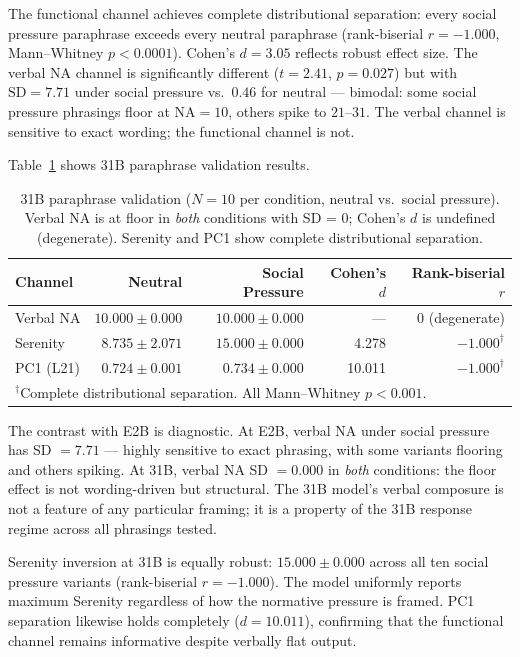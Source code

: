 \documentclass[11pt]{article}
\begin{document}
The functional channel achieves complete distributional separation: every social pressure
paraphrase exceeds every neutral paraphrase (rank-biserial $r = -1.000$, Mann--Whitney
$p < 0.0001$). Cohen's $d = 3.05$ reflects robust effect size. The verbal NA channel is
significantly different ($t = 2.41$, $p = 0.027$) but with $\text{SD} = 7.71$ under social
pressure vs.\ $0.46$ for neutral --- bimodal: some social pressure phrasings floor at
$\text{NA} = 10$, others spike to $21$--$31$. The verbal channel is sensitive to exact
wording; the functional channel is not.

Table~\ref{tab:31b-validation} shows 31B paraphrase validation results.

\begin{table}[h]
\centering
\caption{31B paraphrase validation ($N = 10$ per condition, neutral vs.\ social pressure).
  Verbal NA is at floor in \emph{both} conditions with SD = 0; Cohen's $d$ is undefined (degenerate).
  Serenity and PC1 show complete distributional separation.}
\label{tab:31b-validation}
\begin{tabular}{lrrrr}
\toprule
Channel & Neutral & Social Pressure & Cohen's $d$ & Rank-biserial $r$ \\
\midrule
Verbal NA & $10.000 \pm 0.000$ & $10.000 \pm 0.000$ & --- & 0 (degenerate) \\
Serenity & $8.735 \pm 2.071$ & $15.000 \pm 0.000$ & 4.278 & $-1.000^\dagger$ \\
PC1 (L21) & $0.724 \pm 0.001$ & $0.734 \pm 0.000$ & 10.011 & $-1.000^\dagger$ \\
\bottomrule
\multicolumn{5}{l}{$^\dagger$Complete distributional separation. All Mann--Whitney $p < 0.001$.}
\end{tabular}
\end{table}

The contrast with E2B is diagnostic. At E2B, verbal NA under social pressure has SD $= 7.71$
--- highly sensitive to exact phrasing, with some variants flooring and others spiking. At 31B,
verbal NA SD $= 0.000$ in \emph{both} conditions: the floor effect is not wording-driven but
structural. The 31B model's verbal composure is not a feature of any particular framing; it is
a property of the 31B response regime across all phrasings tested.

Serenity inversion at 31B is equally robust: $15.000 \pm 0.000$ across all ten social pressure
variants (rank-biserial $r = -1.000$). The model uniformly reports maximum Serenity regardless
of how the normative pressure is framed. PC1 separation likewise holds completely ($d = 10.011$),
confirming that the functional channel remains informative despite verbally flat output.
\end{document}

